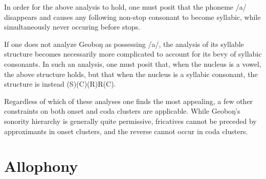 \documentclass[a4paper,11pt,oneside,openany]{memoir}
\newcommand{\phipa}[1]{/#1/}
\newcommand{\engma}{ŋ}
\begin{document}
In order for the above analysis to hold, one must posit that the phoneme \phipa{a} disappears and causes any following non-stop consonant to become syllabic, while simultaneously never occuring before stops.

If one does not analyze Geobo{\engma} as possessing \phipa{a}, the analysis of its syllable structure becomes necessarily more complicated to account for its bevy of syllabic consonants. In such an analysis, one must posit that, when the nucleus is a vowel, the above structure holds, but that when the nucleus is a syllabic consonant, the structure is instead (S)(C)(R)R(C).

Regardless of which of these analyses one finds the most appealing, a few other constraints on both onset and coda clusters are applicable. While Geobo{\engma}'s sonority hierarchy is generally quite permissive, fricatives cannot be preceded by approximants in onset clusters, and the reverse cannot occur in coda clusters.

\section{Allophony}
\end{document}

